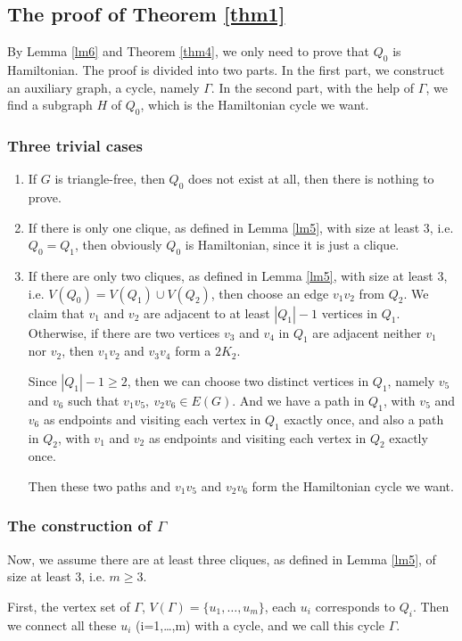 \documentclass{amsart}
\begin{document}
\subsection{The proof of Theorem \ref{thm1}}
By Lemma \ref{lm6} and Theorem \ref{thm4}, we only need to prove that $Q_0$ is Hamiltonian.
The proof is divided into two parts. In the first part, we construct an auxiliary graph, a cycle, namely $\Gamma$. In the second part, with the help of $\Gamma$, we find a subgraph $H$ of $Q_0$,  which is the Hamiltonian cycle we want.
\subsubsection{Three trivial cases}
\begin{enumerate}
\item If $G$ is triangle-free, then $Q_0$ does not exist at all, then there is nothing to prove.
\item If there is only one clique, as defined in Lemma \ref{lm5}, with size at least 3, i.e. $Q_0=Q_1$, then obviously $Q_0$ is Hamiltonian, since it is just a clique.
\item If there are only two cliques, as defined in Lemma \ref{lm5}, with size at least 3, i.e. $V(Q_0)=V(Q_1)\cup V(Q_2)$, then choose an edge $v_1v_2$ from $Q_2$. We claim that $v_1$ and $v_2$ are adjacent to at least $|Q_1|-1$ vertices in $Q_1$. Otherwise, if there are two vertices $v_3$ and $v_4$ in $Q_1$ are adjacent neither $v_1$ nor $v_2$, then $v_1v_2$ and $v_3v_4$ form a $2K_2$.

Since $|Q_1|-1\ge2$, then we can choose two distinct vertices in $Q_1$, namely $v_5$ and $v_6$ such that $v_1v_5,~v_2v_6\in E(G)$. And we have a path in  $Q_1$, with $v_5$ and $v_6$ as endpoints and visiting each vertex in $Q_1$ exactly once, and also a path in $Q_2$, with $v_1$ and $v_2$ as endpoints and visiting each vertex in $Q_2$ exactly once.

Then these two paths and $v_1v_5$ and $v_2v_6$ form the Hamiltonian cycle we want.
\end{enumerate}

\subsubsection{The construction of $\Gamma$}

Now, we assume there are at least three cliques, as defined in Lemma \ref{lm5}, of size at least 3, i.e. $m\ge3$.

First, the vertex set of $\Gamma$, $V(\Gamma)=\{u_1,\ldots,u_m\}$, each $u_i$ corresponds to $Q_i$. 
Then we connect all these $u_i$ (i=1,\ldots,m) with a cycle, and we call this cycle $\Gamma$.
\end{document}
